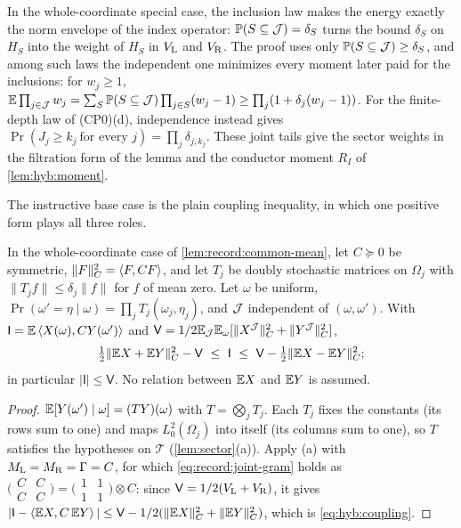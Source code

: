 \begin{remark}
In the whole-coordinate special case, the inclusion law makes the energy
exactly the norm
envelope of the index operator: $\Pr(S\subseteq\Jc)=\delta_S$ turns the bound
$\delta_S$ on $H_S$ into the weight of $H_S$ in $V_{\rm L}$ and $V_{\rm R}$.
The proof uses only $\Pr(S\subseteq\Jc)\ge\delta_S$, and among such laws the
independent one minimizes every moment later paid for the inclusions: for
$w_j\ge1$, $\E\prod_{j\in\Jc}w_j=\sum_S\Pr(S\subseteq\Jc)\prod_{j\in S}(w_j-1)
\ge\prod_j(1+\delta_j(w_j-1))$.
For the finite-depth law of (CP0)(d), independence instead gives
$\Pr(J_j\ge k_j\ \text{for every }j)=\prod_j\delta_{j,k_j}$.
These joint tails give the sector weights in the filtration form of the
lemma and the conductor moment $R_I$ of \cref{lem:hyb:moment}.
\end{remark}

The instructive base case is the plain coupling inequality, in which one
positive form plays all three roles.

\begin{corollary}\label{lem:hyb:coupling}
In the whole-coordinate case of \cref{lem:record:common-mean}, let
$C\succeq0$ be symmetric,
$\|F\|_C^2=\ip F{CF}$, and let $T_j$ be doubly stochastic matrices on
$\Omega_j$ with $\|T_jf\|\le\delta_j\|f\|$ for $f$ of mean zero. Let $\omega$
be uniform, $\Pr(\omega'=\eta\mid\omega)=\prod_jT_j(\omega_j,\eta_j)$, and $\Jc$
independent of $(\omega,\omega')$. With
$\mathsf I=\E\ip{X(\omega)}{CY(\omega')}$ and
$\mathsf V=\frac12\E_\Jc\E_\omega[\|X^\Jc\|_C^2+\|Y^\Jc\|_C^2]$,
\begin{equation}\label{eq:hyb:coupling}
 \tfrac12\|\E X+\E Y\|_C^2-\mathsf V\ \le\ \mathsf I\ \le\
 \mathsf V-\tfrac12\|\E X-\E Y\|_C^2 ;
\end{equation}
in particular $|\mathsf I|\le\mathsf V$. No relation between $\E X$ and $\E Y$
is assumed.
\end{corollary}

\begin{proof}
$\E[Y(\omega')\mid\omega]=(TY)(\omega)$ with $T=\bigotimes_jT_j$. Each $T_j$
fixes the constants (its rows sum to one) and maps $L^2_0(\Omega_j)$ into
itself (its columns sum to one), so $T$ satisfies the hypotheses on
$\mathcal T$ (\cref{lem:sector}(a)). Apply (a) with
$M_{\rm L}=M_{\rm R}=\Gamma=C$, for which \eqref{eq:record:joint-gram} holds as
$\bigl(\begin{smallmatrix}C&C\\C&C\end{smallmatrix}\bigr)=
\bigl(\begin{smallmatrix}1&1\\1&1\end{smallmatrix}\bigr)\otimes C$: since
$\mathsf V=\frac12(V_{\rm L}+V_{\rm R})$, it gives
$|\mathsf I-\ip{\E X}{C\,\E Y}|\le\mathsf V-\frac12(\|\E X\|_C^2+\|\E Y\|_C^2)$,
which is \eqref{eq:hyb:coupling}.
\end{proof}

